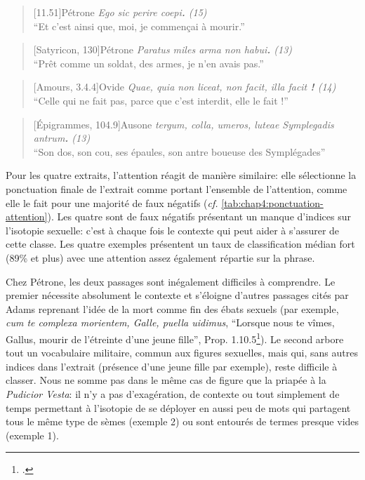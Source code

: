 \begin{quote}[11.51]{Pétrone}
    \textit{Ego sic perire coepi\textbf{.} (15)}\\
    \enquote{Et c'est ainsi que, moi, je commençai à mourir.}
\end{quote}

\begin{quote}[Satyricon, 130]{Pétrone}
    \textit{Paratus miles arma non habui\textbf{.} (13)} \\
    \enquote{Prêt comme un soldat, des armes, je n'en avais pas.}
\end{quote}

\begin{quote}[Amours, 3.4.4]{Ovide}
    \textit{Quae, quia non liceat, non facit, illa facit \textbf{!} (14) }\\
    \enquote{Celle qui ne fait pas, parce que c'est interdit, elle le fait !}
\end{quote}


\begin{quote}[Épigrammes, 104.9]{Ausone}
    \textit{tergum, colla, umeros, luteae Symplegadis antrum\textbf{.} (13) } \\
    \enquote{Son dos, son cou, ses épaules, son antre boueuse des Symplégades}
\end{quote}

Pour les quatre extraits, l'attention réagit de manière similaire: elle sélectionne la ponctuation finale de l'extrait comme portant l'ensemble de l'attention, comme elle le fait pour une majorité de faux négatifs (\textit{cf.} \ref{tab:chap4:ponctuation-attention}). Les quatre sont de faux négatifs présentant un manque d'indices sur l'isotopie sexuelle: c'est à chaque fois le contexte qui peut aider à s'assurer de cette classe. Les quatre exemples présentent un taux de classification médian fort (89\% et plus) avec une attention assez également répartie sur la phrase.

Chez Pétrone, les deux passages sont inégalement difficiles à comprendre. Le premier nécessite absolument le contexte et s'éloigne d'autres passages cités par Adams reprenant l'idée de la mort comme fin des ébats sexuels (par exemple, \textit{cum te complexa morientem, Galle, puella uidimus}, \enquote{Lorsque nous te vîmes, Gallus, mourir de l'étreinte d'une jeune fille}, Prop. 1.10.5\footcite[p.159]{adams}). Le second arbore tout un vocabulaire militaire, commun aux figures sexuelles, mais qui, sans autres indices dans l'extrait (présence d'une jeune fille par exemple), reste difficile à classer. Nous ne somme pas dans le même cas de figure que la priapée à la \textit{Pudicior Vesta}: il n'y a pas d'exagération, de contexte ou tout simplement de temps permettant à l'isotopie de se déployer en aussi peu de mots qui partagent tous le même type de sèmes (exemple 2) ou sont entourés de termes presque vides (exemple 1).

